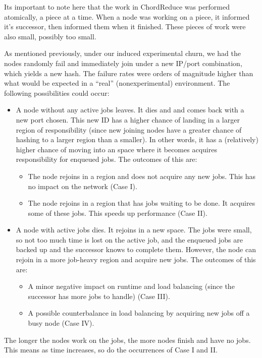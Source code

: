Its important to note here that the work in ChordReduce was performed atomically, a piece at a time.
When a node was working on a piece, it informed it's successor, then informed them when it finished.
These pieces of work were also small, possibly too small.

As mentioned previously, under our induced experimental churn, we had the nodes randomly fail and immediately join under a new IP/port combination, which yields a new hash.
The failure rates were orders of magnitude higher than what would be expected in a ``real'' (nonexperimental) environment.
The following possibilities could occur:
\begin{itemize}
	\item A node without any active jobs leaves.
	It dies and and comes back with a new port chosen.
	This new ID has a higher chance of landing in a larger region of responsibility (since new joining nodes have a greater chance of hashing to a larger region than a smaller).
	In other words, it has a (relatively) higher chance of moving into an space where it becomes acquires responsibility for enqueued jobs.
	The outcomes of this are:
	\begin{itemize}
		\item The node rejoins in a region and does not acquire any new jobs.
		This has no impact on the network (Case I).
		\item The node rejoins in a region that has jobs waiting to be done.
		It acquires some of these jobs.
		This speeds up performance (Case II).
	\end{itemize}
	\item A node with active jobs dies.
	It rejoins in a new space.
	The jobs were small, so not too much time is lost on the active job, and the enqueued jobs are backed up and the successor knows to complete them.
	However, the node can rejoin in a more job-heavy region and acquire new jobs.
	The outcomes of this are:
	\begin{itemize}
		\item A minor negative impact on runtime and load balancing (since the successor has more jobs to handle) (Case III).
		\item A possible counterbalance in load balancing by acquiring new jobs off a busy node (Case IV).
	\end{itemize}
\end{itemize}

The longer the nodes work on the jobs, the more nodes finish and have no jobs.
This means as time increases, so do the occurrences of Case I and II.


